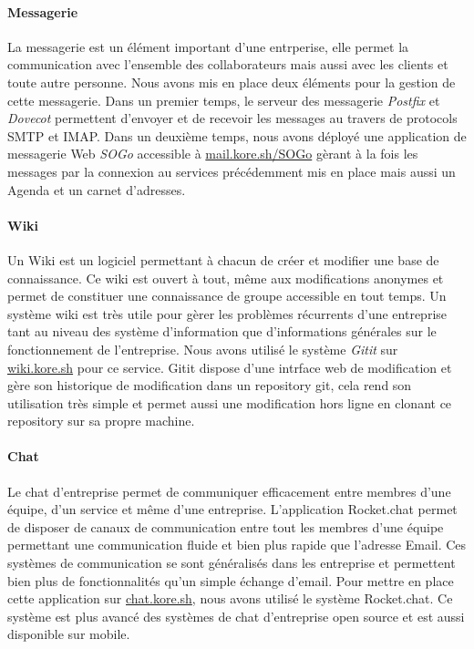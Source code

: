 \paragraph{Messagerie} La messagerie est un élément important d'une entrperise, elle permet la communication avec l'ensemble des collaborateurs mais aussi avec les clients et toute autre personne.
Nous avons mis en place deux éléments pour la gestion de cette messagerie.
Dans un premier temps, le serveur des messagerie \emph{Postfix} et \emph{Dovecot} permettent d'envoyer et de recevoir les messages au travers de protocols SMTP et IMAP.
Dans un deuxième temps, nous avons déployé une application de messagerie Web \emph{SOGo} accessible à \url{mail.kore.sh/SOGo} gèrant à la fois les messages par la connexion au services précédemment mis en place mais aussi un Agenda et un carnet d'adresses.

\paragraph{Wiki} Un Wiki est un logiciel permettant à chacun de créer et modifier une base de connaissance.
Ce wiki est ouvert à tout, même aux modifications anonymes et permet de constituer une connaissance de groupe accessible en tout temps.
Un système wiki est très utile pour gèrer les problèmes récurrents d'une entreprise tant au niveau des système d'information que d'informations générales sur le fonctionnement de l'entreprise.
Nous avons utilisé le système \emph{Gitit} sur \url{wiki.kore.sh} pour ce service.
Gitit dispose d'une intrface web de modification et gère son historique de modification dans un repository git, cela rend son utilisation très simple et permet aussi une modification hors ligne en clonant ce repository sur sa propre machine.

\paragraph{Chat} Le chat d'entreprise permet de communiquer efficacement entre membres d'une équipe, d'un service et même d'une entreprise.
L'application Rocket.chat permet de disposer de canaux de communication entre tout les membres d'une équipe permettant une communication fluide et bien plus rapide que l'adresse Email.
Ces systèmes de communication se sont généralisés dans les entreprise et permettent bien plus de fonctionnalités qu'un simple échange d'email.
Pour mettre en place cette application sur \url{chat.kore.sh}, nous avons utilisé le système Rocket.chat.
Ce système est plus avancé des systèmes de chat d'entreprise open source et est aussi disponible sur mobile.

